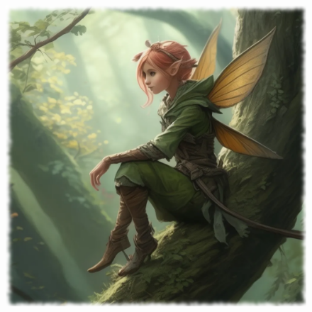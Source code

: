 \begin{figure}[h]
\begin{center}
\includegraphics[scale=0.24]{img/ai-images/pixie.png}
\end{center}
\end{figure}
